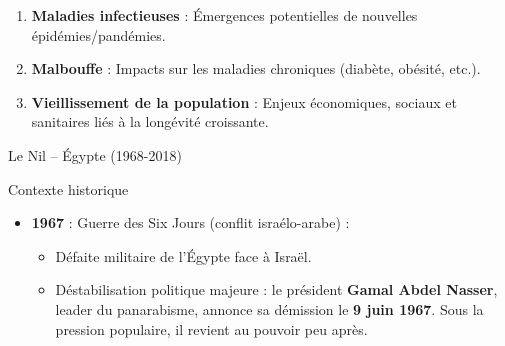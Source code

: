 \documentclass[
  ignorenonframetext,
]{beamer}
\providecommand{\tightlist}{%
  \setlength{\itemsep}{0pt}\setlength{\parskip}{0pt}}\usepackage{longtable,booktabs,array}
\begin{document}
\begin{frame}
\begin{tcolorbox}[enhanced jigsaw, rightrule=.15mm, opacityback=0, colframe=quarto-callout-important-color-frame, bottomtitle=1mm, toptitle=1mm, left=2mm, leftrule=.75mm, title=\textcolor{quarto-callout-important-color}{\faExclamation}\hspace{0.5em}{Les 3 grandes menaces à surveiller pour les années à venir :}, toprule=.15mm, breakable, colback=white, coltitle=black, opacitybacktitle=0.6, titlerule=0mm, bottomrule=.15mm, colbacktitle=quarto-callout-important-color!10!white, arc=.35mm]

\begin{enumerate}
\tightlist
\item
  \textbf{Maladies infectieuses} : Émergences potentielles de nouvelles
  épidémies/pandémies.\\
\item
  \textbf{Malbouffe} : Impacts sur les maladies chroniques (diabète,
  obésité, etc.).\\
\item
  \textbf{Vieillissement de la population} : Enjeux économiques, sociaux
  et sanitaires liés à la longévité croissante.\\
\end{enumerate}

\end{tcolorbox}
\end{frame}

\begin{frame}{Le Nil -- Égypte (1968-2018)}
\protect\hypertarget{le-nil-uxe9gypte-1968-2018}{}
\begin{block}{Contexte historique}
\protect\hypertarget{contexte-historique}{}
\begin{itemize}
\tightlist
\item
  \textbf{1967} : Guerre des Six Jours (conflit israélo-arabe) :

  \begin{itemize}
  \tightlist
  \item
    Défaite militaire de l'Égypte face à Israël.
  \item
    Déstabilisation politique majeure : le président \textbf{Gamal Abdel
    Nasser}, leader du panarabisme, annonce sa démission le \textbf{9
    juin 1967}. Sous la pression populaire, il revient au pouvoir peu
    après.
  \end{itemize}
\end{itemize}
\end{block}
\end{frame}
\end{document}
